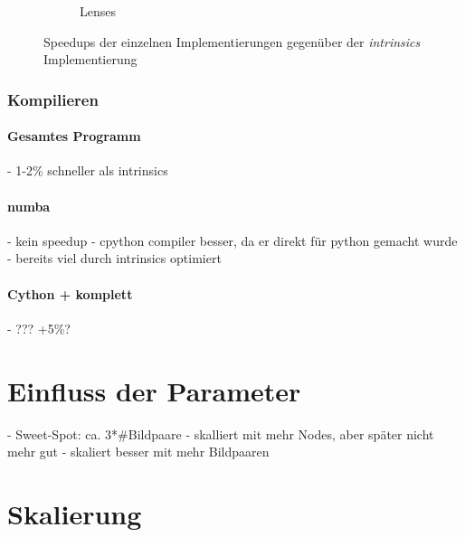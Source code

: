 \begin{center}
\begin{figure}[htbp]
\begin{subfigure}[b]{0.54\textwidth}
			\caption{Lenses}
			\label{fig:speedups_lenses}
		\end{subfigure}
		\caption{Speedups der einzelnen Implementierungen gegenüber der \textit{intrinsics} Implementierung}
		\label{fig:speedups}
	\end{figure}
\end{center}

\subsubsection{Kompilieren}

\paragraph{Gesamtes Programm}

\begin{correctmore}
	- 1-2\% schneller als intrinsics
\end{correctmore}

\paragraph{numba}

\begin{correctmore}
	- kein speedup
	- cpython compiler besser, da er direkt für python gemacht wurde
	- bereits viel durch intrinsics optimiert
\end{correctmore}

\paragraph{Cython + komplett}

\begin{correctmore}
	- ??? +5\%?
\end{correctmore}

\section{Einfluss der Parameter}

\begin{correctmore}
	- Sweet-Spot: ca. 3*\#Bildpaare
	- skalliert mit mehr Nodes, aber später nicht mehr gut
	- skaliert besser mit mehr Bildpaaren
\end{correctmore}

\section{Skalierung}

